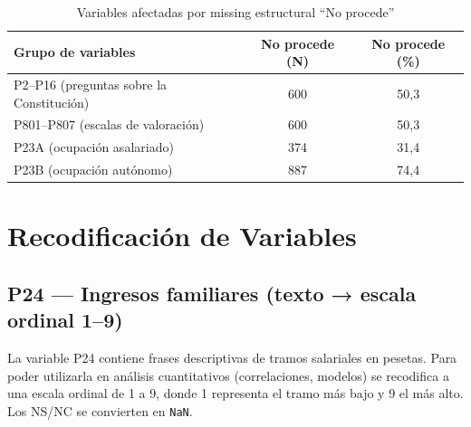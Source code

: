 \documentclass[12pt,a4paper]{article}
\newcommand{\thead}[1]{\cellcolor{tableheader}\color{white}\textbf{#1}}
\begin{document}
\vspace{0.5em}

\begin{table}[H]
\centering
\renewcommand{\arraystretch}{1.3}
\begin{tabular}{lcc}
\toprule
\thead{Grupo de variables} & \thead{No procede (N)} & \thead{No procede (\%)} \\
\midrule
P2--P16 (preguntas sobre la Constitución)    & 600 & 50,3 \\
\rowcolor{tablerow}
P801--P807 (escalas de valoración)           & 600 & 50,3 \\
P23A (ocupación asalariado)                  & 374 & 31,4 \\
\rowcolor{tablerow}
P23B (ocupación autónomo)                    & 887 & 74,4 \\
\bottomrule
\end{tabular}
\caption{Variables afectadas por missing estructural ``No procede''}
\end{table}

\newpage

\section{Recodificación de Variables}

\subsection{P24 — Ingresos familiares (texto → escala ordinal 1--9)}

La variable P24 contiene frases descriptivas de tramos salariales en pesetas. Para poder utilizarla en análisis cuantitativos (correlaciones, modelos) se recodifica a una escala ordinal de 1 a 9, donde 1 representa el tramo más bajo y 9 el más alto. Los NS/NC se convierten en \texttt{NaN}.
\end{document}
